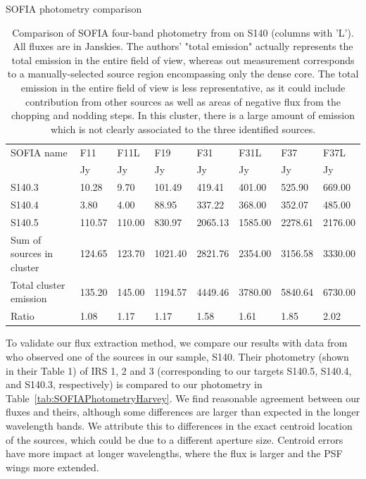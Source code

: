 \renewcommand{\arraystretch}{1.5}
\begin{table}[!h]
\scriptsize
\caption{SOFIA photometry comparison} \label{tab:SOFIAPhotometryHarvey}
\vspace{-0.5cm}
\begin{longtable}{l|P{1cm}P{1cm}|P{1cm}|P{1cm}P{1cm}|P{1cm}P{1cm}}
\toprule															
SOFIA name	&	F11	&	F11L	&	F19	&	F31	&	F31L	&	F37	&	F37L	\\
	&	Jy	&	Jy	&	Jy	&	Jy	&	Jy	&	Jy	&	Jy	\\
\midrule															
S140.3	&	10.28	&	9.70	&	101.49	&	419.41	&	401.00	&	525.90	&	669.00	\\
S140.4	&	3.80	&	4.00	&	88.95	&	337.22	&	368.00	&	352.07	&	485.00	\\
S140.5	&	110.57	&	110.00	&	830.97	&	2065.13	&	1585.00	&	2278.61	&	2176.00	\\
\midrule															
Sum of sources in cluster	&	124.65	&	123.70	&	1021.40	&	2821.76	&	2354.00	&	3156.58	&	3330.00	\\
Total cluster emission	&	135.20	&	145.00	&	1194.57	&	4449.46	&	3780.00	&	5840.64	&	6730.00	\\
Ratio	&	1.08	&	1.17	&	1.17	&	1.58	&	1.61	&	1.85	&	2.02	\\
\bottomrule					
	\end{longtable} 
\caption*{Comparison of SOFIA four-band photometry from \citet{Harvey:2012kw} on S140 (columns with 'L'). All fluxes are in Janskies. The authors' "total emission" actually represents the total emission in the entire field of view, whereas out measurement corresponds to a manually-selected source region encompassing only the dense core. The total emission in the entire field of view is less representative, as it could include contribution from other sources as well as areas of negative flux from the chopping and nodding steps. In this cluster, there is a large amount of emission which is not clearly associated to the three identified sources.}

\end{table}


To validate our flux extraction method, we compare our results with data from \citet{Harvey:2012kw} who observed one of the sources in our sample, S140. Their photometry (shown in their Table 1) of IRS 1, 2 and 3 (corresponding to our targets S140.5, S140.4, and S140.3, respectively) is compared to our photometry in Table~\ref{tab:SOFIAPhotometryHarvey}. We find reasonable agreement between our fluxes and theirs, although some differences are larger than expected in the longer wavelength bands. We attribute this to differences in the exact centroid location of the sources, which could be due to a different aperture size. Centroid errors have more impact at longer wavelengths, where the flux is larger and the PSF wings more extended.


